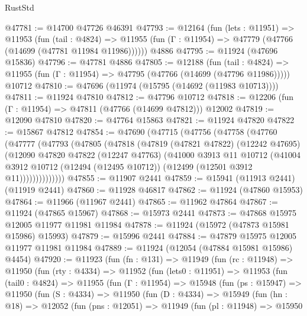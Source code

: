 \begin{lexlean}{RustStd}
\begin{coremodule}
@47781 := @14700 @47726 @46391
@47793 := @12164
    (fun (lets : @11951) =>
    @11953
      (fun (tail : @4824) =>
      @11955 (fun (Γ : @11954) => @47779 (@47766 (@14699 (@47781 @11984 @11986))))))
    @4886
@47795 := @11924 (@47696 @15836)
@47796 := @47781 @4886
@47805 := @12188
    (fun (tail : @4824) => @11955 (fun (Γ : @11954) => @47795 (@47766 (@14699 (@47796 @11986)))))
    @10712
@47810 := @47696 (@11974 (@15795 (@14692 (@11983 @10713))))
@47811 := @11924 @47810
@47812 := @47796 @10712
@47818 := @12206 (fun (Γ : @11954) => @47811 (@47766 (@14699 @47812))) @12002
@47819 := @12090 @47810
@47820 := @47764 @15863
@47821 := @11924 @47820
@47822 := @15867 @47812
@47854 := @47690
    (@47715
      (@47756
        (@47758
          (@47760
            (@47777
              (@47793
                (@47805
                  (@47818
                    (@47819
                      (@47821 @47822)
                      (@12242 @47695)
                      (@12090
                        @47820
                        @47822
                        (@12247 @47763)
                        (@41000
                          @3913
                          @11
                          @10712
                          (@41004
                            @3912
                            @10712
                            (@12494 (@12495 @10712))
                            (@12499 (@12501 @3912 @11))))))))))))))
@47855 := @11907 @2441
@47859 := @15941 (@11913 @2441) (@11919 @2441)
@47860 := @11928 @46817
@47862 := @11924 (@47860 @15953)
@47864 := @11966 (@11967 @2441)
@47865 := @11962 @47864
@47867 := @11924 (@47865 @15967)
@47868 := @15973 @2441
@47873 := @47868 @15975 @12005 @11977 @11981 @11984
@47878 := @11924 (@15972 (@47873 @15981 @15986) @15993)
@47879 := @15996 @2441
@47884 := @47879 @15975 @12005 @11977 @11981 @11984
@47889 := @11924 (@12054 (@47884 @15981 @15986) @4454)
@47920 := @11923
    (fun (fn : @131) =>
    @11949
      (fun (rc : @11948) =>
      @11950
        (fun (rty : @4334) =>
        @11952
          (fun (lets0 : @11951) =>
          @11953
            (fun (tail0 : @4824) =>
            @11955
              (fun (Γ : @11954) =>
              @15948
                (fun (ps : @15947) =>
                @11950
                  (fun (S : @4334) =>
                  @11950
                    (fun (D : @4334) =>
                    @15949
                      (fun (hn : @18) =>
                      @12052
                        (fun (pns : @12051) =>
                        @11949
                          (fun (pl : @11948) =>
                          @15950

\end{coremodule}
\end{lexlean}
